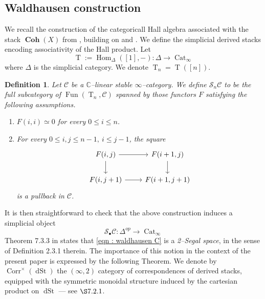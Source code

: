 \documentclass[11pt]{article}
\newtheorem{definition}{Definition}
\newcommand{\BC}{\mathbb{C}}
\newcommand{\cohflat}{\boldsymbol{\operatorname{Coh}}}
\newcommand{\waldhausen}{\mathcal{S}_{\bullet}}
\begin{document}
\subsection{Waldhausen construction}\label{subsec : waldhausen}
    We recall the construction of the categoricall Hall algebra associated with the stack $\cohflat(X)$ from \cite{Porta2019TwodimensionalCH}, building on \cite{Dyckerhoff_2019} and \cite{gaitsgory2017study}. We define the simplicial derived stacks encoding associativity of the Hall product. Let 
    \[
        \operatorname{T} := \operatorname{Hom}_{\Delta}([1] ,-) \colon \Delta \longrightarrow \operatorname{Cat}_{\infty}
    \]
    where $\Delta$ is the simplicial category. We denote $\operatorname{T}_n = \operatorname{T}([n])$.
    
\begin{definition}
    Let $\mathcal{C}$ be a $\BC$--linear stable $\infty$--category. We define $\mathcal{S}_n\mathcal{C}$ to be the full subcategory of $\operatorname{Fun}(\operatorname{T}_n,\mathcal{C})$ spanned by those functors $F$ satisfying the following assumptions.
    \begin{enumerate}
        \item $F(i,i) \simeq 0$ for every $0\leq i \leq n$.
        \item For every $0\leq i,j \leq n-1, \ i\leq j-1$, the square
        \[\begin{tikzcd}
	{F(i,j)} & {F(i+1,j)} \\
	{F(i,j+1)} & {F(i+1,j+1)}
	\arrow[from=1-1, to=1-2]
	\arrow[from=1-2, to=2-2]
	\arrow[from=1-1, to=2-1]
	\arrow[from=2-1, to=2-2]
\end{tikzcd}\]
    is a pullback in $\mathcal{C}$.
    \end{enumerate}
    \end{definition}
 \noindent It is then straightforward to check that the above construction induces a simplicial object
   \begin{equation}\label{eqn : waldhausen C}
        \waldhausen\mathcal{C} \colon \Delta^{op} \longrightarrow \operatorname{Cat}_{\infty}
   \end{equation}
   Theorem 7.3.3 in \cite{Dyckerhoff_2019} states that \eqref{eqn : waldhausen C} is a \textit{2--Segal space}, in the sense of Definition 2.3.1 therein. The importance of this notion in the context of the present paper is expressed by the following Theorem. We denote by $\operatorname{Corr}^{\times}(\operatorname{dSt})$ the $(\infty,2)$ category of correspondences of derived stacks, equipped with the symmetric monoidal structure induced by the cartesian product on $\operatorname{dSt}$ --- see \cite{gaitsgory2017study} $\S 7.2.1$.
\end{document}
